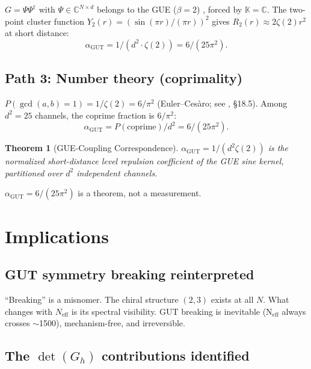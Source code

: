 \documentclass[12pt]{article}
\newtheorem{theorem}{Theorem}[section]
\theoremstyle{remark}
\begin{document}
$G = \Psi\Psi^\dagger$ with $\Psi \in \mathbb{C}^{N \times d}$ belongs
to the GUE ($\beta = 2$) \cite{Mehta}, forced by
$\mathbb{K} = \mathbb{C}$. The two-point cluster function $Y_2(r) = (\sin(\pi r)/(\pi r))^2$ gives $R_2(r) \approx 2\zeta(2)r^2$ at short distance:
\begin{equation}
\alpha_\text{GUT} = 1/(d^2 \cdot \zeta(2)) = 6/(25\pi^2).
\end{equation}

\subsection{Path 3: Number theory (coprimality)}

$P(\gcd(a,b) = 1) = 1/\zeta(2) = 6/\pi^2$
(Euler--Ces\`aro; see \cite{Hardy-Wright}, \S18.5). Among $d^2 = 25$ channels, the coprime fraction is $6/\pi^2$:
\begin{equation}
\alpha_\text{GUT} = P(\text{coprime})/d^2 = 6/(25\pi^2).
\end{equation}

\begin{theorem}[GUE-Coupling Correspondence]
$\alpha_\text{GUT} = 1/(d^2\zeta(2))$ is the normalized short-distance level repulsion coefficient of the GUE sine kernel, partitioned over $d^2$ independent channels.
\end{theorem}

$\alpha_\text{GUT} = 6/(25\pi^2)$ is a theorem, not a measurement.

\section{Implications}

\subsection{GUT symmetry breaking reinterpreted}

``Breaking'' is a misnomer. The chiral structure $(2,3)$ exists at all $N$. What changes with $N_\text{eff}$ is its spectral visibility. GUT breaking is inevitable (N$_\text{eff}$ always crosses $\sim$1500), mechanism-free, and irreversible.

\subsection{The $\det(G_h)$ contributions identified}
\end{document}
